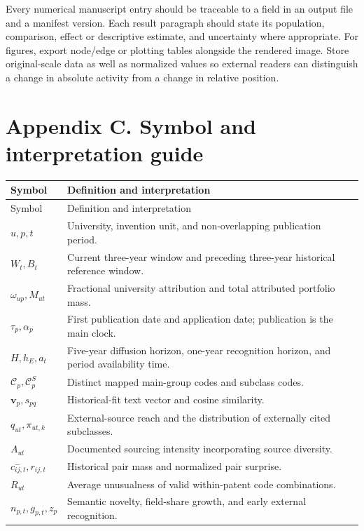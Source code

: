Every numerical manuscript entry should be traceable to a field in an output
file and a manifest version. Each result paragraph should state its population,
comparison, effect or descriptive estimate, and uncertainty where appropriate.
For figures, export node/edge or plotting tables alongside the rendered image.
Store original-scale data as well as normalized values so external readers can
distinguish a change in absolute activity from a change in relative position.

\section{Appendix C. Symbol and interpretation guide}\label{app:symbols}
\begingroup\small
\begin{longtable}{P{2.85cm}P{10.9cm}}
\toprule Symbol & Definition and interpretation\\\midrule\endfirsthead
\toprule Symbol & Definition and interpretation\\\midrule\endhead
$u,p,t$ & University, invention unit, and non-overlapping publication period.\\
$W_t,B_t$ & Current three-year window and preceding three-year historical reference window.\\
$\omega_{up},M_{ut}$ & Fractional university attribution and total attributed portfolio mass.\\
$\tau_p,\alpha_p$ & First publication date and application date; publication is the main clock.\\
$H,h_E,a_t$ & Five-year diffusion horizon, one-year recognition horizon, and period availability time.\\
$\mathcal{C}_p,\mathcal{C}^{S}_p$ & Distinct mapped main-group codes and subclass codes.\\
$\mathbf{v}_p,s_{pq}$ & Historical-fit text vector and cosine similarity.\\
$q_{ut},\pi_{ut,k}$ & External-source reach and the distribution of externally cited subclasses.\\
$A_{ut}$ & Documented sourcing intensity incorporating source diversity.\\
$c_{ij,t}^{-},r_{ij,t}$ & Historical pair mass and normalized pair surprise.\\
$R_{ut}$ & Average unusualness of valid within-patent code combinations.\\
$n_{p,t},g_{p,t},z_p$ & Semantic novelty, field-share growth, and early external recognition.\\

\end{longtable}

